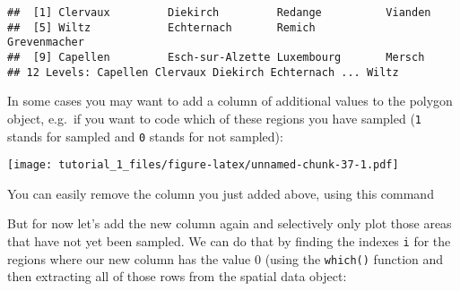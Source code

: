\documentclass[]{article}
\newenvironment{Shaded}{\begin{snugshade}}{\end{snugshade}}
\newcommand{\DataTypeTok}[1]{\textcolor[rgb]{0.13,0.29,0.53}{#1}}
\newcommand{\DecValTok}[1]{\textcolor[rgb]{0.00,0.00,0.81}{#1}}
\newcommand{\KeywordTok}[1]{\textcolor[rgb]{0.13,0.29,0.53}{\textbf{#1}}}
\newcommand{\NormalTok}[1]{#1}
\newcommand{\OperatorTok}[1]{\textcolor[rgb]{0.81,0.36,0.00}{\textbf{#1}}}
\newcommand{\OtherTok}[1]{\textcolor[rgb]{0.56,0.35,0.01}{#1}}
\newcommand{\StringTok}[1]{\textcolor[rgb]{0.31,0.60,0.02}{#1}}
\begin{document}
\begin{verbatim}
##  [1] Clervaux         Diekirch         Redange          Vianden         
##  [5] Wiltz            Echternach       Remich           Grevenmacher    
##  [9] Capellen         Esch-sur-Alzette Luxembourg       Mersch          
## 12 Levels: Capellen Clervaux Diekirch Echternach ... Wiltz
\end{verbatim}

In some cases you may want to add a column of additional values to the
polygon object, e.g.~if you want to code which of these regions you have
sampled (\texttt{1} stands for sampled and \texttt{0} stands for not
sampled):

\begin{Shaded}
\end{Shaded}

\texttt{[image: tutorial\_1\_files/figure-latex/unnamed-chunk-37-1.pdf]}

You can easily remove the column you just added above, using this
command

\begin{Shaded}
\end{Shaded}

But for now let's add the new column again and selectively only plot
those areas that have not yet been sampled. We can do that by finding
the indexes \texttt{i} for the regions where our new column has the
value 0 (using the \texttt{which()} function and then extracting all of
those rows from the spatial data object:
\end{document}
